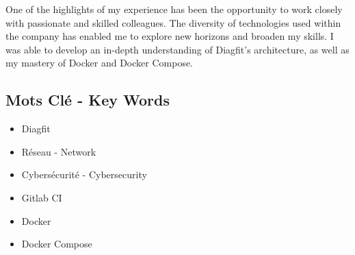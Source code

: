 One of the highlights of my experience has been the opportunity to work closely with passionate and skilled colleagues.
The diversity of technologies used within the company has enabled me to explore new horizons and broaden my skills.
I was able to develop an in-depth understanding of Diagfit's architecture, as well as my mastery of Docker and Docker Compose.

\subsection*{Mots Clé - Key Words}
\begin{itemize}
    \item Diagfit
    \item Réseau - Network
    \item Cybersécurité - Cybersecurity
    \item Gitlab CI
    \item Docker
    \item Docker Compose
\end{itemize}
\clearpage
